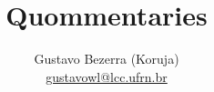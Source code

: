 \documentclass{article}
\title{Quommentaries}
\author{
    Gustavo Bezerra (Koruja)\\
    \href{mailto:gustavowl@lcc.ufrn.br}{gustavowl@lcc.ufrn.br}
}
\begin{document}
	\maketitle

	\tableofcontents
	\pagebreak

	
	
	
	
\end{document}
